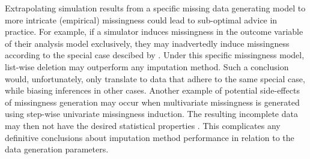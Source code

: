 \documentclass[bimj,fleqn]{w-art}
\begin{document}


Extrapolating simulation results from a specific missing data generating model to more intricate (empirical) missingness could lead to sub-optimal advice in practice. For example, if a simulator induces missingness in the outcome variable of their analysis model exclusively, they may inadvertedly induce missingness according to the special case descibed by \citet[][p. \S 2.7]{buur18}. Under this specific missingness model, list-wise deletion may outperform any imputation method. Such a conclusion would, unfortunately, only translate to data that adhere to the same special case, while biasing inferences in other cases. %
Another example of potential side-effects of missingness generation may occur when multivariate missingness is generated using step-wise univariate missingness induction. The resulting incomplete data may then not have the desired statistical properties \citep{ampute}. This complicates any definitive conclusions about imputation method performance in relation to the data generation parameters.
\end{document}
